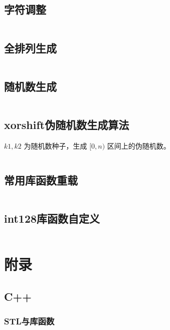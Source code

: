 \documentclass[a4paper, twoside]{article}
\begin{document}
\subsection{字符调整}
\inputminted{cpp}{../src/杂项/字符调整.cpp}

\subsection{全排列生成}
\inputminted{cpp}{../src/杂项/全排列生成.cpp}

\subsection{随机数生成}
\inputminted{cpp}{../src/杂项/随机数生成.cpp}

\subsection{xorshift伪随机数生成算法}
$k1, k2$ 为随机数种子，生成 $[0, n)$ 区间上的伪随机数。
\inputminted{cpp}{../src/杂项/xorshift伪随机数生成算法.cpp}

\subsection{常用库函数重载}
\inputminted{cpp}{../src/杂项/常用库函数重载.cpp}

\subsection{int128库函数自定义}
\inputminted{cpp}{../src/杂项/int128库函数自定义.cpp}

\newpage
\section{附录}
\subsection{C++}
    \subsubsection{STL与库函数}
\end{document}

